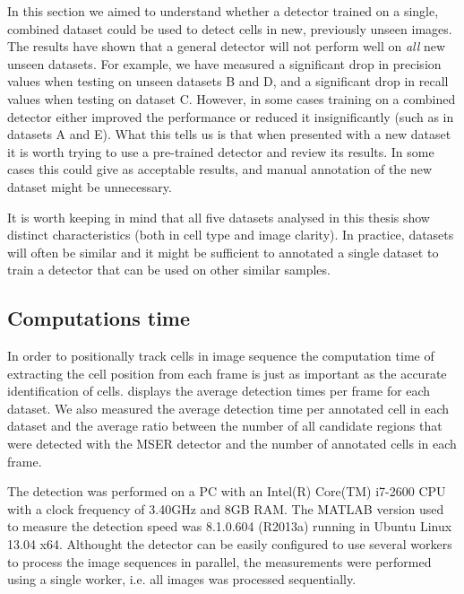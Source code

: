 		In this section we aimed to understand whether a detector trained on a single, combined dataset could be used to detect cells in new, previously unseen images. The results have shown that a general detector will not perform well on \textit{all} new unseen datasets. For example, we have measured a significant drop in precision values when testing on unseen datasets B and D, and a significant drop in recall values when testing on dataset C. However, in some cases training on a combined detector either improved the performance or reduced it insignificantly (such as in datasets A and E). What this tells us is that when presented with a new dataset it is worth trying to use a pre-trained detector and review its results. In some cases this could give as acceptable results, and manual annotation of the new dataset might be unnecessary.
		
		It is worth keeping in mind that all five datasets analysed in this thesis show distinct characteristics (both in cell type and image clarity). In practice, datasets will often be similar and it might be sufficient to annotated a single dataset to train a detector that can be used on other similar samples.
	
	\subsection{Computations time \statusfirstdraft}
	
		In order to positionally track cells in image sequence the computation time of extracting the cell position from each frame is just as important as the accurate identification of cells.  displays the average detection times per frame for each dataset. We also measured the average detection time per annotated cell in each dataset and the average ratio between the number of all candidate regions that were detected with the MSER detector and the number of annotated cells in each frame.
		
		The detection was performed on a PC with an Intel(R) Core(TM) i7-2600 CPU with a clock frequency of 3.40GHz and 8GB RAM. The MATLAB version used to measure the detection speed was 8.1.0.604 (R2013a) running in Ubuntu Linux 13.04 x64. Althought the detector can be easily configured to use several workers to process the image sequences in parallel, the measurements were performed using a single worker, i.e. all images was processed sequentially.
		
